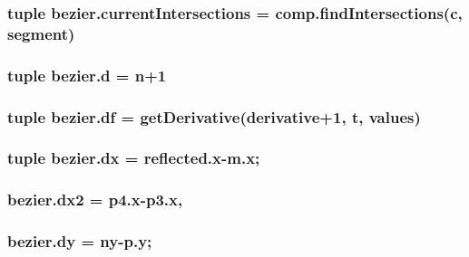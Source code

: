 \subsubsection[{current\+Intersections}]{\setlength{\rightskip}{0pt plus 5cm}tuple bezier.\+current\+Intersections = comp.\+find\+Intersections({\bf c}, {\bf segment})}\label{namespacebezier_a58fa425c725113cb9f5504c6c3603dec}
\hypertarget{namespacebezier_a6d52742576263b89b839a5e3cbc68ef1}{}
\subsubsection[{d}]{\setlength{\rightskip}{0pt plus 5cm}tuple bezier.\+d = {\bf n}+1}\label{namespacebezier_a6d52742576263b89b839a5e3cbc68ef1}
\hypertarget{namespacebezier_a25e79f92e794bbc94fad7d80d53bd07c}{}
\subsubsection[{df}]{\setlength{\rightskip}{0pt plus 5cm}tuple bezier.\+df = get\+Derivative(derivative+1, {\bf t}, {\bf values})}\label{namespacebezier_a25e79f92e794bbc94fad7d80d53bd07c}
\hypertarget{namespacebezier_a9c15e0bd907e89888a94c1abad682558}{}
\subsubsection[{dx}]{\setlength{\rightskip}{0pt plus 5cm}tuple bezier.\+dx = reflected.\+x-\/m.\+x;}\label{namespacebezier_a9c15e0bd907e89888a94c1abad682558}
\hypertarget{namespacebezier_ac0aa3f491a487ced7f96fa3288ad805b}{}
\subsubsection[{dx2}]{\setlength{\rightskip}{0pt plus 5cm}bezier.\+dx2 = p4.\+x-\/p3.\+x,}\label{namespacebezier_ac0aa3f491a487ced7f96fa3288ad805b}
\hypertarget{namespacebezier_a119a2ba91f8e406351b32bb87ab3f461}{}
\subsubsection[{dy}]{\setlength{\rightskip}{0pt plus 5cm}bezier.\+dy = {\bf ny}-\/p.\+y;}\label{namespacebezier_a119a2ba91f8e406351b32bb87ab3f461}
\hypertarget{namespacebezier_a2863af6e4685d9fce5c5669231ec503e}{}
